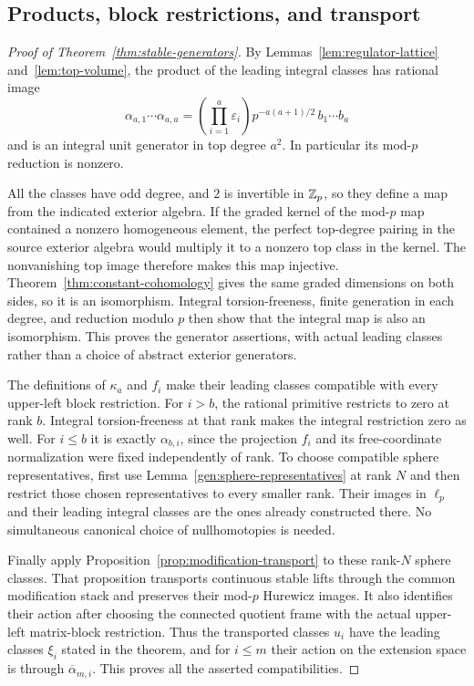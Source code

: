 \subsection{Products, block restrictions, and transport}
\label{gen:products-section}

\begin{proof}[Proof of Theorem~\ref{thm:stable-generators}]
By Lemmas~\ref{lem:regulator-lattice} and~\ref{lem:top-volume}, the
product of the leading integral classes has rational image
\[
 \alpha_{a,1}\cdots\alpha_{a,a}
   =\left(\prod_{i=1}^a\varepsilon_i\right)
      p^{-a(a+1)/2}\,b_1\cdots b_a
\]
and is an integral unit generator in top degree $a^2$.  In particular
its mod-$p$ reduction is nonzero.

All the classes have odd degree, and $2$ is invertible in $\mathbb Z_p$, so
they define a map from the indicated exterior algebra.  If the graded kernel of the mod-$p$ map contained a nonzero
homogeneous element, the perfect top-degree pairing in the source
exterior algebra would multiply it to a nonzero top class in the
kernel.  The nonvanishing top image therefore makes this map
injective.
Theorem~\ref{thm:constant-cohomology} gives the same graded dimensions
on both sides, so it is an isomorphism.  Integral torsion-freeness,
finite generation in each degree, and reduction modulo $p$ then show
that the integral map is also an isomorphism.  This proves the
generator assertions, with actual leading classes rather than a
choice of abstract exterior generators.

The definitions of $\kappa_a$ and $f_i$ make their leading classes
compatible with every upper-left block restriction.  For $i>b$, the
rational primitive restricts to zero at rank $b$.  Integral
torsion-freeness at that rank makes the integral restriction zero as
well.  For $i\leq b$ it is exactly $\alpha_{b,i}$, since the
projection $f_i$ and its free-coordinate normalization were fixed
independently of rank.  To choose compatible sphere representatives,
first use Lemma~\ref{gen:sphere-representatives} at rank $N$ and then
restrict those chosen representatives to every smaller rank.  Their
images in $\ell_p$ and their leading integral classes are the ones
already constructed there.  No simultaneous canonical choice of
nullhomotopies is needed.

Finally apply Proposition~\ref{prop:modification-transport} to these
rank-$N$ sphere classes.  That proposition transports continuous
stable lifts through the common modification stack and preserves
their mod-$p$ Hurewicz images.  It also identifies their action after
choosing the connected quotient frame with the actual upper-left
matrix-block restriction.  Thus the transported classes $u_i$ have
the leading classes $\xi_i$ stated in the theorem, and for $i\leq m$
their action on the extension space is through
$\overline\alpha_{m,i}$.  This proves all the asserted
compatibilities.
\end{proof}
